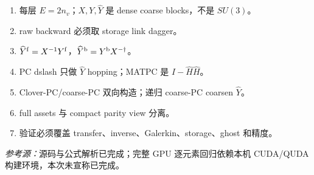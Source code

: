 \documentclass[UTF8,a4paper,11pt]{ctexart}
\newcommand{\Yhat}{\widehat Y}\newcommand{\src}[1]{\par\smallskip\noindent\textit{参考源：}#1\par\smallskip}
\begin{document}
\begin{enumerate}[leftmargin=2.5em]
\item 每层 $E=2n_v$；$X,Y,\Yhat$ 是 dense coarse blocks，不是 $SU(3)$。
\item raw backward 必须取 storage link dagger。
\item $\Yhat^{\rm f}=X^{-1}Y^{\rm f}$，$\Yhat^{\rm b}=Y^{\rm b}X^{-\dagger}$。
\item PC dslash 只做 $\Yhat$ hopping；MATPC 是 $I-\widehat H\widehat H$。
\item Clover-PC/coarse-PC 双向构造；递归 coarse-PC coarsen $\Yhat$。
\item full assets 与 compact parity view 分离。
\item 验证必须覆盖 transfer、inverse、Galerkin、storage、ghost 和精度。
\end{enumerate}
\src{源码与公式解析已完成；完整 GPU 逐元素回归依赖本机 CUDA/QUDA 构建环境，本次未宣称已完成。}
\end{document}

